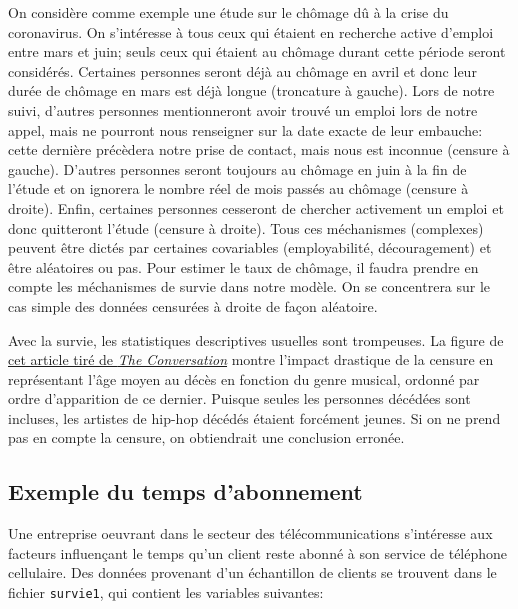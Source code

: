 \documentclass[
  11pt,
  letterpaper,
]{scrbook}
\theoremstyle{definition}
\theoremstyle{remark}
\begin{document}
On considère comme exemple une étude sur le chômage dû à la crise du
coronavirus. On s'intéresse à tous ceux qui étaient en recherche active
d'emploi entre mars et juin; seuls ceux qui étaient au chômage durant
cette période seront considérés. Certaines personnes seront déjà au
chômage en avril et donc leur durée de chômage en mars est déjà longue
(troncature à gauche). Lors de notre suivi, d'autres personnes
mentionneront avoir trouvé un emploi lors de notre appel, mais ne
pourront nous renseigner sur la date exacte de leur embauche: cette
dernière précèdera notre prise de contact, mais nous est inconnue
(censure à gauche). D'autres personnes seront toujours au chômage en
juin à la fin de l'étude et on ignorera le nombre réel de mois passés au
chômage (censure à droite). Enfin, certaines personnes cesseront de
chercher activement un emploi et donc quitteront l'étude (censure à
droite). Tous ces méchanismes (complexes) peuvent être dictés par
certaines covariables (employabilité, découragement) et être aléatoires
ou pas. Pour estimer le taux de chômage, il faudra prendre en compte les
méchanismes de survie dans notre modèle. On se concentrera sur le cas
simple des données censurées à droite de façon aléatoire.

Avec la survie, les statistiques descriptives usuelles sont trompeuses.
La figure de
\href{https://theconversation.com/music-to-die-for-how-genre-affects-popular-musicians-life-expectancy-36660}{cet
article tiré de \emph{The Conversation}} montre l'impact drastique de la
censure en représentant l'âge moyen au décès en fonction du genre
musical, ordonné par ordre d'apparition de ce dernier. Puisque seules
les personnes décédées sont incluses, les artistes de hip-hop décédés
étaient forcément jeunes. Si on ne prend pas en compte la censure, on
obtiendrait une conclusion erronée.

\subsection{Exemple du temps
d'abonnement}\label{exemple-du-temps-dabonnement}

Une entreprise oeuvrant dans le secteur des télécommunications
s'intéresse aux facteurs influençant le temps qu'un client reste abonné
à son service de téléphone cellulaire. Des données provenant d'un
échantillon de clients se trouvent dans le fichier \texttt{survie1}, qui
contient les variables suivantes:
\end{document}
